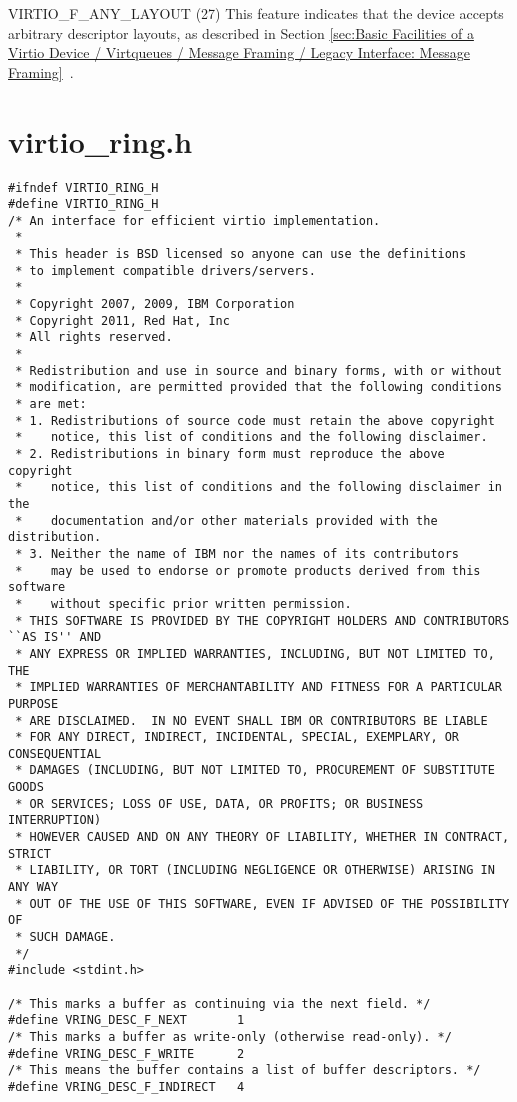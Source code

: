 VIRTIO_F_ANY_LAYOUT (27) This feature indicates that the device
  accepts arbitrary descriptor layouts, as described in Section
  \ref{sec:Basic Facilities of a Virtio Device / Virtqueues / Message Framing / Legacy Interface: Message Framing}~.

\chapter{virtio_ring.h}\label{sec:virtio-ring.h}

\begin{lstlisting}
#ifndef VIRTIO_RING_H
#define VIRTIO_RING_H
/* An interface for efficient virtio implementation.
 *
 * This header is BSD licensed so anyone can use the definitions
 * to implement compatible drivers/servers.
 *
 * Copyright 2007, 2009, IBM Corporation
 * Copyright 2011, Red Hat, Inc
 * All rights reserved.
 *
 * Redistribution and use in source and binary forms, with or without
 * modification, are permitted provided that the following conditions
 * are met:
 * 1. Redistributions of source code must retain the above copyright
 *    notice, this list of conditions and the following disclaimer.
 * 2. Redistributions in binary form must reproduce the above copyright
 *    notice, this list of conditions and the following disclaimer in the
 *    documentation and/or other materials provided with the distribution.
 * 3. Neither the name of IBM nor the names of its contributors
 *    may be used to endorse or promote products derived from this software
 *    without specific prior written permission.
 * THIS SOFTWARE IS PROVIDED BY THE COPYRIGHT HOLDERS AND CONTRIBUTORS ``AS IS'' AND
 * ANY EXPRESS OR IMPLIED WARRANTIES, INCLUDING, BUT NOT LIMITED TO, THE
 * IMPLIED WARRANTIES OF MERCHANTABILITY AND FITNESS FOR A PARTICULAR PURPOSE
 * ARE DISCLAIMED.  IN NO EVENT SHALL IBM OR CONTRIBUTORS BE LIABLE
 * FOR ANY DIRECT, INDIRECT, INCIDENTAL, SPECIAL, EXEMPLARY, OR CONSEQUENTIAL
 * DAMAGES (INCLUDING, BUT NOT LIMITED TO, PROCUREMENT OF SUBSTITUTE GOODS
 * OR SERVICES; LOSS OF USE, DATA, OR PROFITS; OR BUSINESS INTERRUPTION)
 * HOWEVER CAUSED AND ON ANY THEORY OF LIABILITY, WHETHER IN CONTRACT, STRICT
 * LIABILITY, OR TORT (INCLUDING NEGLIGENCE OR OTHERWISE) ARISING IN ANY WAY
 * OUT OF THE USE OF THIS SOFTWARE, EVEN IF ADVISED OF THE POSSIBILITY OF
 * SUCH DAMAGE.
 */
#include <stdint.h>

/* This marks a buffer as continuing via the next field. */
#define VRING_DESC_F_NEXT       1
/* This marks a buffer as write-only (otherwise read-only). */
#define VRING_DESC_F_WRITE      2
/* This means the buffer contains a list of buffer descriptors. */
#define VRING_DESC_F_INDIRECT   4


\end{lstlisting}
